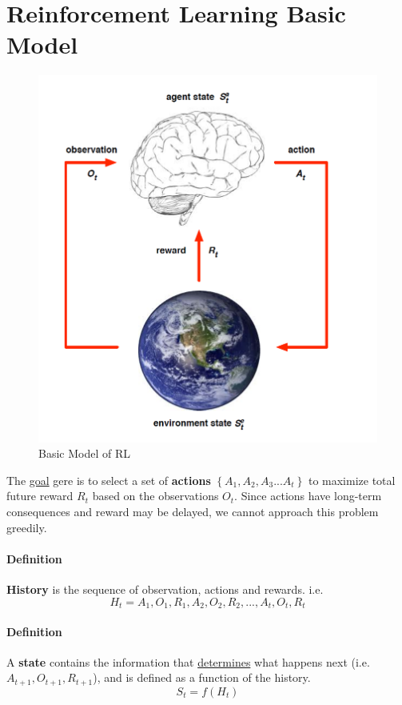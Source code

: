 \section{Reinforcement Learning Basic Model}
	\begin{figure}[h]
	\includegraphics[scale=0.5]{model.png}
	\centering
	\caption{Basic Model of RL}
	\end{figure}
	The \underline{goal} gere is to select a set of \textbf{actions} $ \left\{ A_1, A_2, A_3 ... A_t \right\} $ to maximize total future reward $R_t$ based on the observations $O_t$. Since actions have long-term consequences and reward may be delayed, we cannot approach this problem greedily.

	\paragraph{Definition} \textbf{History} is the sequence of observation, actions and rewards. i.e. 
	\begin{equation*} %
	H_t = A_1, O_1, R_1, A_2, O_2, R_2, ... , A_t, O_t, R_t
	\end{equation*}

	\paragraph{Definition} A \textbf{state} contains the information that \underline{determines} what happens next (i.e. $A_{t+1}, O_{t+1}, R_{t+1}$), and is defined as a function of the history.
	\begin{equation*}
	S_t = f(H_t)
	\end{equation*}

